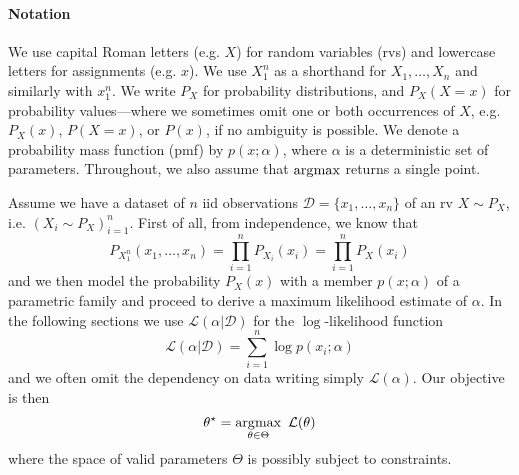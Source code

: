 
\paragraph{Notation}

We use capital Roman letters (e.g. $X$) for random variables (rvs) and lowercase letters for assignments (e.g. $x$). We use $X_1^n$ as a shorthand for $X_1, \ldots, X_n$ and similarly with $x_1^n$. 
We write $P_X$ for probability distributions, and $P_X(X=x)$ for probability values---where we sometimes omit one or both occurrences of $X$, e.g. $P_X(x)$, $P(X=x)$, or $P(x)$, if no ambiguity is possible. 
We denote a probability mass function (pmf) by $p(x; \alpha)$, where $\alpha$ is a deterministic set of parameters. Throughout, we also assume that $\operatorname*{\arg\!\max}$ returns a single point.

Assume we have a dataset of $n$ iid observations $\mathcal D = \{x_1, \ldots, x_n\}$ of an rv $X \sim P_X$, i.e. $\left(X_i \sim P_X\right)_{i=1}^n$.
First of all, from independence, we know that 
\begin{equation}
P_{X_1^n}(x_1, \ldots, x_n) = \prod_{i=1}^n P_{X_i}(x_i) = \prod_{i=1}^n P_{X}(x_i) 
\end{equation}
and we then model the probability $P_X(x)$ with a member $p(x; \alpha)$ of a parametric family  and proceed to derive a maximum likelihood estimate of $\alpha$.
In the following sections we use $\mathcal L(\alpha|\mathcal D)$ for the $\log$-likelihood function
\begin{equation}
\mathcal L(\alpha|\mathcal D) = \sum_{i=1}^n \log p(x_i; \alpha)
\end{equation}
and we often omit the dependency on data writing simply $\mathcal L(\alpha)$.
Our objective is then
\begin{equation}\label{eq:mle}
\theta^\star = \operatorname*{\arg\!\max}_{\theta \in \Theta} ~ \mathcal L(\theta) 
\end{equation}
where the space of valid parameters $\Theta$ is possibly subject to constraints.
